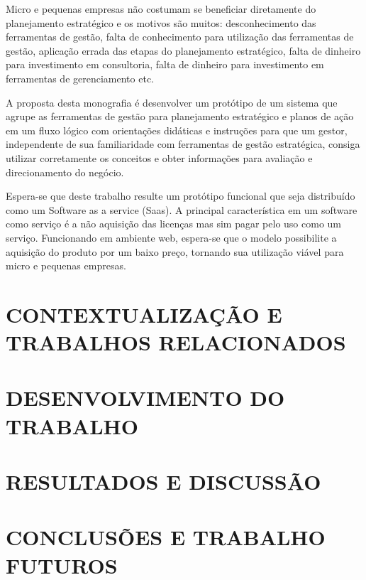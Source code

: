\documentclass{abnt}
\begin{document}
Micro e pequenas empresas não costumam se beneficiar diretamente do planejamento
estratégico e os motivos são muitos: desconhecimento das ferramentas de gestão, falta de
conhecimento para utilização das ferramentas de gestão, aplicação errada das etapas do
planejamento estratégico, falta de dinheiro para investimento em consultoria, falta de dinheiro
para investimento em ferramentas de gerenciamento etc.

A proposta desta monografia é desenvolver um protótipo de um sistema que agrupe as
ferramentas de gestão para planejamento estratégico e planos de ação em um fluxo lógico
com orientações didáticas e instruções para que um gestor, independente de sua familiaridade
com ferramentas de gestão estratégica, consiga utilizar corretamente os conceitos e obter
informações para avaliação e direcionamento do negócio.

Espera-se que deste trabalho resulte um protótipo funcional que seja distribuído como um
Software as a service (Saas). A principal característica em um software como serviço é a não
aquisição das licenças mas sim pagar pelo uso como um serviço. Funcionando em ambiente
web, espera-se que o modelo possibilite a aquisição do produto por um baixo preço, tornando
sua utilização viável para micro e pequenas empresas.\\

\chapter{CONTEXTUALIZAÇÃO E TRABALHOS RELACIONADOS}
\chapter{DESENVOLVIMENTO DO TRABALHO}
\chapter{RESULTADOS E DISCUSSÃO}
\chapter{CONCLUSÕES E TRABALHO FUTUROS}


\end{document}
